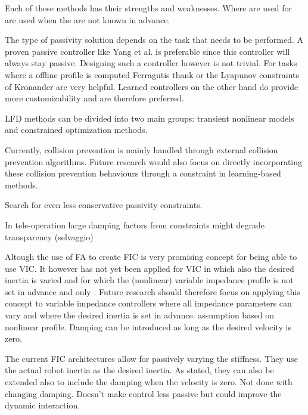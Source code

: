 Each of these methods has their strengths and weaknesses. Where are used for are used when the are not known in advance.


The type of passivity solution depends on the task that needs to be performed. A proven passive controller like \cite{yangHumanlikeAdaptationForce2011} Yang et al. is preferable since this controller will always stay passive. Designing such a controller however is not trivial. For tasks where a offline profile is computed \cite{ferragutiTankbasedApproachImpedance2013} Ferragutis thank or the Lyapunov constraints of \cite{kronanderStabilityConsiderationsVariable2016} Kronander are very helpful. Learned controllers on the other hand do provide more customizability and are therefore preferred.


LFD methods can be divided into two main groups: transient nonlinear models and constrained optimization methods.


Currently, collision prevention is mainly handled through external collision prevention algorithms. Future research would also focus on directly incorporating these collision prevention behaviours through a constraint in learning-based methods.


Search for even less conservative passivity constraints.


In tele-operation large damping factors from constraints might degrade transparency (selvaggio)


Altough the use of FA to create FIC is very promising concept for being able to use VIC. It however has not yet been applied for VIC in which also the desired inertia is varied and for which the (nonlinear) variable impedance profile is not set in advance and only . Future research should therefore focus on applying this concept to variable impedance controllers where all impedance parameters can vary and where the desired inertia is set in advance. assumption based on nonlinear profile.
Damping can be introduced as long as the desired velocity is zero.

The current FIC architectures allow for passively varying the stiffness. They use the actual robot inertia as the desired inertia. As stated, they can also be extended also to include the damping when the velocity is zero.
Not done with changing damping. Doesn't make control less passive but could improve the dynamic interaction.

